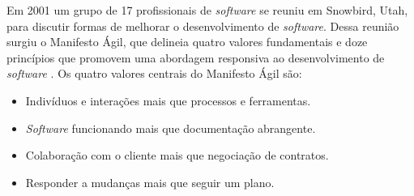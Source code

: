 \documentclass[
	12pt,
	openright,
	twoside,
	a4paper,
	english,
	brazil
	]{abntex2}
\begin{document}
Em 2001 um grupo de 17 profissionais de \textit{software} se reuniu em Snowbird, Utah, para discutir formas de melhorar o desenvolvimento de \textit{software}. Dessa reunião surgiu o Manifesto Ágil, que delineia quatro valores fundamentais e doze princípios que promovem uma abordagem responsiva ao desenvolvimento de \textit{software} \cite{AgileManifest}. Os quatro valores centrais do Manifesto Ágil são:

\begin{itemize}
  \item Indivíduos e interações mais que processos e ferramentas.
  \item \textit{Software} funcionando mais que documentação abrangente.
  \item Colaboração com o cliente mais que negociação de contratos.
  \item Responder a mudanças mais que seguir um plano.
\end{itemize}
  
\end{document}
